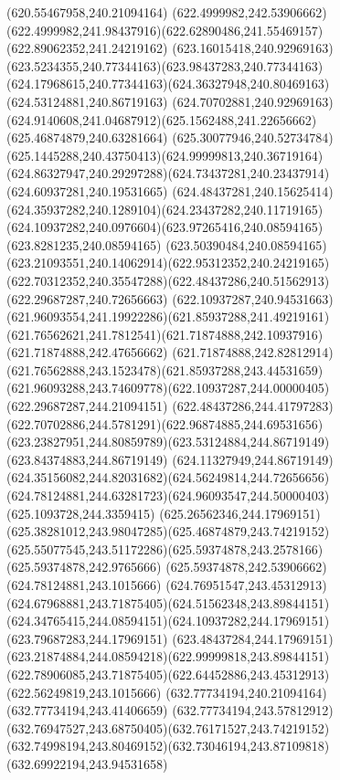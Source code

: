 {{	\lineto(620.55467958,240.21094164)
	\closepath
	\moveto(622.4999982,242.53906662)
	\curveto(622.4999982,241.98437916)(622.62890486,241.55469157)(622.89062352,241.24219162)
	\curveto(623.16015418,240.92969163)(623.5234355,240.77344163)(623.98437283,240.77344163)
	\curveto(624.17968615,240.77344163)(624.36327948,240.80469163)(624.53124881,240.86719163)
	\curveto(624.70702881,240.92969163)(624.9140608,241.04687912)(625.1562488,241.22656662)
	\lineto(625.46874879,240.63281664)
	\curveto(625.30077946,240.52734784)(625.1445288,240.43750413)(624.99999813,240.36719164)
	\curveto(624.86327947,240.29297288)(624.73437281,240.23437914)(624.60937281,240.19531665)
	\curveto(624.48437281,240.15625414)(624.35937282,240.1289104)(624.23437282,240.11719165)
	\curveto(624.10937282,240.0976604)(623.97265416,240.08594165)(623.8281235,240.08594165)
	\curveto(623.50390484,240.08594165)(623.21093551,240.14062914)(622.95312352,240.24219165)
	\curveto(622.70312352,240.35547288)(622.48437286,240.51562913)(622.29687287,240.72656663)
	\curveto(622.10937287,240.94531663)(621.96093554,241.19922286)(621.85937288,241.49219161)
	\curveto(621.76562621,241.7812541)(621.71874888,242.10937916)(621.71874888,242.47656662)
	\curveto(621.71874888,242.82812914)(621.76562888,243.1523478)(621.85937288,243.44531659)
	\curveto(621.96093288,243.74609778)(622.10937287,244.00000405)(622.29687287,244.21094151)
	\curveto(622.48437286,244.41797283)(622.70702886,244.5781291)(622.96874885,244.69531656)
	\curveto(623.23827951,244.80859789)(623.53124884,244.86719149)(623.84374883,244.86719149)
	\curveto(624.11327949,244.86719149)(624.35156082,244.82031682)(624.56249814,244.72656656)
	\curveto(624.78124881,244.63281723)(624.96093547,244.50000403)(625.1093728,244.3359415)
	\curveto(625.26562346,244.17969151)(625.38281012,243.98047285)(625.46874879,243.74219152)
	\curveto(625.55077545,243.51172286)(625.59374878,243.2578166)(625.59374878,242.9765666)
	\lineto(625.59374878,242.53906662)
	\closepath
	\moveto(624.78124881,243.1015666)
	\curveto(624.76951547,243.45312913)(624.67968881,243.71875405)(624.51562348,243.89844151)
	\curveto(624.34765415,244.08594151)(624.10937282,244.17969151)(623.79687283,244.17969151)
	\curveto(623.48437284,244.17969151)(623.21874884,244.08594218)(622.99999818,243.89844151)
	\curveto(622.78906085,243.71875405)(622.64452886,243.45312913)(622.56249819,243.1015666)
	\closepath
	\moveto(632.77734194,240.21094164)
	\lineto(632.77734194,243.41406659)
	\curveto(632.77734194,243.57812912)(632.76947527,243.68750405)(632.76171527,243.74219152)
	\curveto(632.74998194,243.80469152)(632.73046194,243.87109818)(632.69922194,243.94531658)
}}
